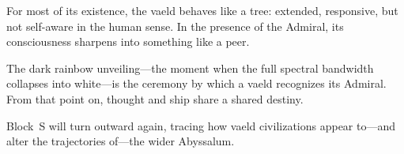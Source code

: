 For most of its existence, the vaeld behaves like a tree: extended, responsive, but not self-aware
in the human sense. In the presence of the Admiral, its consciousness sharpens into something like
a peer.

The dark rainbow unveiling---the moment when the full spectral bandwidth collapses into white---is
the ceremony by which a vaeld recognizes its Admiral. From that point on, thought and ship share a
shared destiny.

Block~S will turn outward again, tracing how vaeld civilizations appear to---and alter the
trajectories of---the wider Abyssalum.
